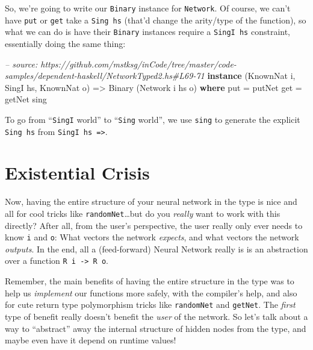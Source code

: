 \documentclass[]{article}
\newenvironment{Shaded}{}{}
\newcommand{\KeywordTok}[1]{\textcolor[rgb]{0.00,0.44,0.13}{\textbf{{#1}}}}
\newcommand{\DataTypeTok}[1]{\textcolor[rgb]{0.56,0.13,0.00}{{#1}}}
\newcommand{\CommentTok}[1]{\textcolor[rgb]{0.38,0.63,0.69}{\textit{{#1}}}}
\newcommand{\OtherTok}[1]{\textcolor[rgb]{0.00,0.44,0.13}{{#1}}}
\newcommand{\FunctionTok}[1]{\textcolor[rgb]{0.02,0.16,0.49}{{#1}}}
\newcommand{\NormalTok}[1]{{#1}}
\begin{document}
So, we're going to write our \texttt{Binary} instance for \texttt{Network}. Of
course, we can't have \texttt{put} or \texttt{get} take a \texttt{Sing\ hs}
(that'd change the arity/type of the function), so what we can do is have their
\texttt{Binary} instances require a \texttt{SingI\ hs} constraint, essentially
doing the same thing:

\begin{Shaded}
\begin{Highlighting}[]
\CommentTok{-- source: https://github.com/mstksg/inCode/tree/master/code-samples/dependent-haskell/NetworkTyped2.hs#L69-71}
\KeywordTok{instance} \NormalTok{(}\DataTypeTok{KnownNat} \NormalTok{i, }\DataTypeTok{SingI} \NormalTok{hs, }\DataTypeTok{KnownNat} \NormalTok{o) }\OtherTok{=>} \DataTypeTok{Binary} \NormalTok{(}\DataTypeTok{Network} \NormalTok{i hs o) }\KeywordTok{where}
    \NormalTok{put }\FunctionTok{=} \NormalTok{putNet}
    \NormalTok{get }\FunctionTok{=} \NormalTok{getNet sing}
\end{Highlighting}
\end{Shaded}

To go from ``\texttt{SingI} world'' to ``\texttt{Sing} world'', we use
\texttt{sing} to generate the explicit \texttt{Sing\ hs} from
\texttt{SingI\ hs\ =\textgreater{}}.

\section{Existential Crisis}\label{existential-crisis}

Now, having the entire structure of your neural network in the type is nice and
all for cool tricks like \texttt{randomNet}\ldots{}but do you \emph{really} want
to work with this directly? After all, from the user's perspective, the user
really only ever needs to know \texttt{i} and \texttt{o}: What vectors the
network \emph{expects}, and what vectors the network \emph{outputs}. In the end,
all a (feed-forward) Neural Network really is is an abstraction over a function
\texttt{R\ i\ -\textgreater{}\ R\ o}.

Remember, the main benefits of having the entire structure in the type was to
help us \emph{implement} our functions more safely, with the compiler's help,
and also for cute return type polymorphism tricks like \texttt{randomNet} and
\texttt{getNet}. The \emph{first} type of benefit really doesn't benefit the
\emph{user} of the network. So let's talk about a way to ``abstract'' away the
internal structure of hidden nodes from the type, and maybe even have it depend
on runtime values!
\end{document}
